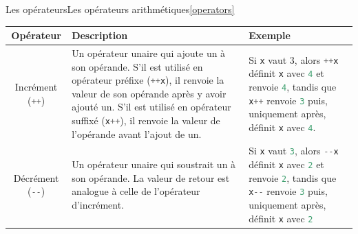 \documentclass{beamer}
\begin{document}
\begin{frame}{Les opérateurs}{Les opérateurs arithmétiques\cref{operators}}
    \begin{tiny}
        \begin{table}[h!]
            \centering
            \begin{tabular}{|c|p{4cm}|p{4cm}|}
                \hline
                \textbf{Opérateur}                                               & \textbf{Description}                                                                                                                                                                                                                                                                                                                & \textbf{Exemple}                                                                                                                                                                                                                                                                                                                                                                                                                                                  \\
                \hline
                Incrément (\lstinline[language=Javascript]!++!)                  & Un opérateur unaire qui ajoute un à son opérande. S'il est utilisé en opérateur préfixe (\lstinline[language=Javascript]!++x!), il renvoie la valeur de son opérande après y avoir ajouté un. S'il est utilisé en opérateur suffixé (\lstinline[language=Javascript]!x++!), il renvoie la valeur de l'opérande avant l'ajout de un. & Si \lstinline[language=Javascript]!x! vaut 3, alors \lstinline[language=Javascript]!++x! définit \lstinline[language=Javascript]!x! avec \lstinline[language=Javascript]!4! et renvoie \lstinline[language=Javascript]!4!, tandis que \lstinline[language=Javascript]!x++! renvoie \lstinline[language=Javascript]!3! puis, uniquement après, définit \lstinline[language=Javascript]!x! avec \lstinline[language=Javascript]!4!.                                 \\
                \hline
                Décrément (\lstinline[language=Javascript]!--!)                  & Un opérateur unaire qui soustrait un à son opérande. La valeur de retour est analogue à celle de l'opérateur d'incrément.                                                                                                                                                                                                           & Si \lstinline[language=Javascript]!x! vaut \lstinline[language=Javascript]!3!, alors \lstinline[language=Javascript]!--x! définit \lstinline[language=Javascript]!x! avec \lstinline[language=Javascript]!2! et renvoie \lstinline[language=Javascript]!2!, tandis que \lstinline[language=Javascript]!x--! renvoie \lstinline[language=Javascript]!3! puis, uniquement après, définit \lstinline[language=Javascript]!x! avec \lstinline[language=Javascript]!2! \\

\end{tabular}
\end{table}
\end{tiny}
\end{frame}
\end{document}
